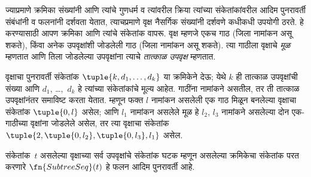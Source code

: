 \documentclass[../../../include/open-logic-section]{subfiles}
\begin{document}

ज्याप्रमाणे क्रमिका संख्यांनी आणि त्यांचे गुणधर्म व त्यांवरील क्रिया त्यांच्या
संकेतांकांवरील आदिम पुनरावर्ती संबंधांनी व फलनांनी दर्शवता येतात, त्याचप्रमाणे
वृक्ष नैसर्गिक संख्यांनी दर्शवणे कधीकधी उपयोगी ठरते. हे करण्यासाठी आपण
क्रमिका आणि त्यांचे संकेतांक वापरू. वृक्ष म्हणजे एकच गाठ (जिला नामांकन असू
शकते), किंवा अनेक उपवृक्षांशी जोडलेली गाठ (जिला नामांकन असू शकते). त्या
गाठीला वृक्षाचे \emph{मूळ} म्हणतात आणि तिला जोडलेल्या उपवृक्षांना त्याचे
\emph{तात्काळ उपवृक्ष} म्हणतात.

वृक्षाचा पुनरावर्ती संकेतांक $\tuple{k, d_1, \dots, d_k}$ या क्रमिकेने
देऊ; येथे $k$ ही तात्काळ उपवृक्षांची संख्या आणि $d_1$, \dots,~$d_k$ हे
त्यांच्या संकेतांकांचे मूल्य आहेत. गाठींना नामांकने असतील, तर ती तात्काळ
उपवृक्षांनंतर समाविष्ट करता येतात. म्हणून फक्त $l$ नामांकन असलेली एक गाठ
मिळून बनलेल्या वृक्षाचा संकेतांक $\tuple{0,l}$ असेल; आणि $l_1$ नामांकन
असलेले मूळ हे $l_2$, $l_3$ नामांकने असलेल्या दोन एक-गाठीच्या वृक्षांना
जोडलेले असेल, तर त्या वृक्षाचा संकेतांक $\tuple{2,
  \tuple{0, l_2}, \tuple{0, l_3}, l_1}$ असेल.

\begin{prop}
  संकेतांक~$t$ असलेल्या वृक्षाच्या सर्व उपवृक्षांचे संकेतांक घटक म्हणून
  असलेल्या क्रमिकेचा संकेतांक परत करणारे $\fn{SubtreeSeq}(t)$ हे फलन
  आदिम पुनरावर्ती आहे.
\end{prop}
\end{document}
